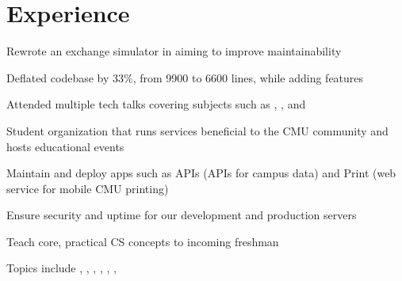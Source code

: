 \documentclass[]{deedy-resume-openfont}
\begin{document}
\begin{minipage}[t]{0.66\textwidth} 


\section{Experience}

\vspace{\topsep} %
\begin{tightemize}
\item Rewrote an exchange simulator in  aiming to improve maintainability
\item Deflated codebase by 33\%, from 9900 to 6600 lines, while adding features
\item Attended multiple tech talks covering subjects such as , , and 
\end{tightemize}
\sectionsep

\begin{tightemize}
\item Student organization that runs services beneficial to the CMU community and hosts educational events
\item Maintain and deploy apps such as APIs (APIs for campus data) and Print (web service for mobile CMU printing)
\item Ensure security and uptime for our development and production servers
\end{tightemize}
\sectionsep

\begin{tightemize}
\item Teach core, practical CS concepts to incoming freshman
\item Topics include , , , , , , 
\end{tightemize}
\sectionsep



\end{minipage}
\end{document}
